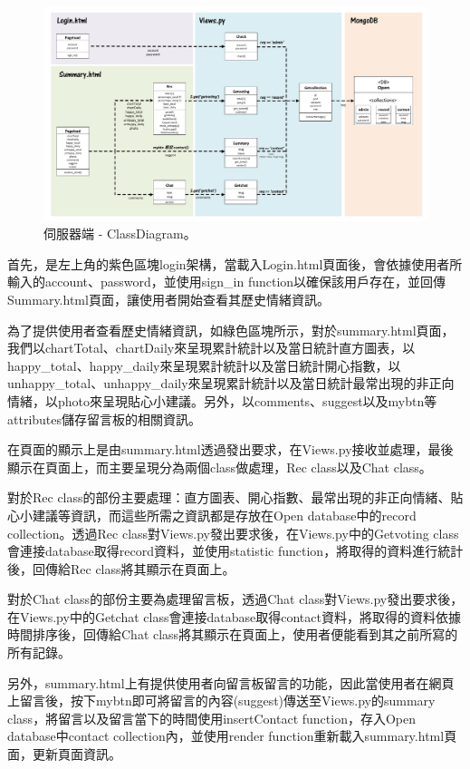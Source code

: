 \documentclass[12pt]{scrreprt}
\begin{document}
\begin{figure}[!h]
\begin{center}
\includegraphics[width=.8\textwidth]{./figs/diagrams/class/server-ClassDiagram.pdf}
\end{center}
\vspace{-1cm}
\caption{伺服器端 - ClassDiagram。}
\label{fig:server-ClassDiagram}
\end{figure}

首先，是左上角的紫色區塊login架構，當載入Login.html頁面後，會依據使用者所輸入的account、password，並使用sign_in function以確保該用戶存在，並回傳Summary.html頁面，讓使用者開始查看其歷史情緒資訊。

為了提供使用者查看歷史情緒資訊，如綠色區塊所示，對於summary.html頁面，我們以chartTotal、chartDaily來呈現累計統計以及當日統計直方圖表，以happy_total、happy_daily來呈現累計統計以及當日統計開心指數，以
unhappy_total、unhappy_daily來呈現累計統計以及當日統計最常出現的非正向情緒，以photo來呈現貼心小建議。另外，以comments、suggest以及mybtn等attributes儲存留言板的相關資訊。

在頁面的顯示上是由summary.html透過發出要求，在Views.py接收並處理，最後顯示在頁面上，而主要呈現分為兩個class做處理，Rec class以及Chat class。


對於Rec class的部份主要處理：直方圖表、開心指數、最常出現的非正向情緒、貼心小建議等資訊，而這些所需之資訊都是存放在Open database中的record collection。透過Rec class對Views.py發出要求後，在Views.py中的Getvoting class會連接database取得record資料，並使用statistic function，將取得的資料進行統計後，回傳給Rec class將其顯示在頁面上。

對於Chat class的部份主要為處理留言板，透過Chat class對Views.py發出要求後，在Views.py中的Getchat class會連接database取得contact資料，將取得的資料依據時間排序後，回傳給Chat class將其顯示在頁面上，使用者便能看到其之前所寫的所有記錄。

另外，summary.html上有提供使用者向留言板留言的功能，因此當使用者在網頁上留言後，按下mybtn即可將留言的內容(suggest)傳送至Views.py的summary class，將留言以及留言當下的時間使用insertContact function，存入Open database中contact collection內，並使用render function重新載入summary.html頁面，更新頁面資訊。
\end{document}
